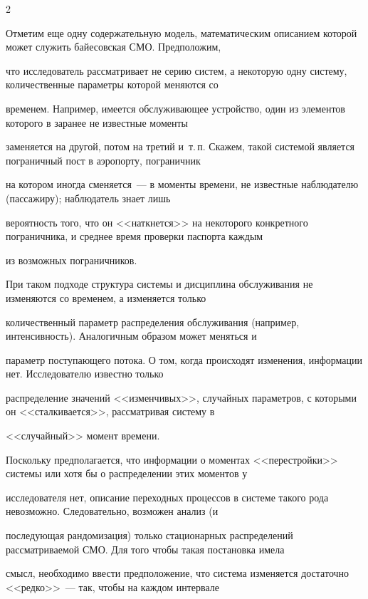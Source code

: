 \begin{multicols}{2}
{}





Отметим еще одну содержательную модель, математическим описанием которой может служить байесовская СМО. Предположим,


что исследователь рассматривает не серию систем, а некоторую одну систему, количественные параметры которой меняются со


временем. Например, имеется обслуживающее устройство, один из элементов которого в заранее не известные моменты


заменяется на другой, потом на третий и~т.\,п. Скажем, такой системой является пограничный пост в аэропорту, пограничник


на котором иногда сменяется~--- в моменты времени, не известные наблюдателю (пассажиру); наблюдатель знает лишь


вероятность того, что он <<наткнется>> на некоторого конкретного пограничника, и среднее время проверки паспорта каждым


из возможных пограничников.





При таком подходе структура системы и дис\-цип\-ли\-на обслуживания не изменяются со временем, а изменяется только


количественный параметр распределения обслуживания (например, интенсивность). Аналогичным образом может меняться и


параметр поступающего потока. О том, когда происходят изменения, информации нет. Исследователю известно только


распределение значений <<изменчивых>>, случайных параметров, с которыми он <<сталкивается>>, рассматривая систему в


<<случайный>> момент времени.





Поскольку предполагается, что информации о моментах <<перестройки>> системы или хотя бы о распределении этих моментов у


исследователя нет, описание переходных процессов в системе такого рода невозможно. Следовательно, возможен анализ (и


последующая рандомизация) только стационарных распределений рассматриваемой СМО. Для того чтобы такая постановка имела


смысл, необходимо ввести предположение, что система изменяется достаточно <<редко>>~--- так, чтобы на каждом интервале



\end{multicols}
